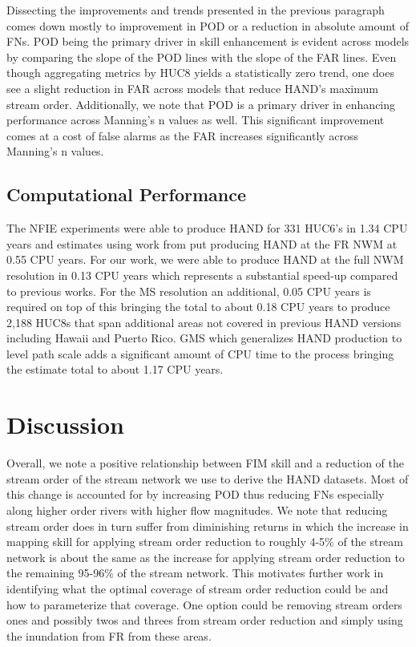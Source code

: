 \documentclass[draft]{dependencies/agujournal2019}
\begin{document}
Dissecting the improvements and trends presented in the previous paragraph comes down mostly to improvement in POD or a reduction in absolute amount of FNs.
POD being the primary driver in skill enhancement is evident across models by comparing the slope of the POD lines with the slope of the FAR lines.
Even though aggregating metrics by HUC8 yields a statistically zero trend, one does see a slight reduction in FAR across models that reduce HAND's maximum stream order.
Additionally, we note that POD is a primary driver in enhancing performance across Manning's n values as well.
This significant improvement comes at a cost of false alarms as the FAR increases significantly across Manning's n values.
%
\subsection{Computational Performance}
\label{ssec:compuational_performance}
%
The NFIE experiments were able to produce HAND for 331 HUC6's in 1.34 CPU years \cite{liu2016cybergis} and estimates using work from  put producing HAND at the FR NWM at 0.55 CPU years. 
For our work, we were able to produce HAND at the full NWM resolution in 0.13 CPU years which represents a substantial speed-up compared to previous works.
For the MS resolution an additional, 0.05 CPU years is required on top of this bringing the total to about 0.18 CPU years to produce 2,188 HUC8s that span additional areas not covered in previous HAND versions including Hawaii and Puerto Rico.
GMS which generalizes HAND production to level path scale adds a significant amount of CPU time to the process bringing the estimate total to about 1.17 CPU years.
%
\clearpage %
\section{Discussion}
\label{sec:discussion}
%
Overall, we note a positive relationship between FIM skill and a reduction of the stream order of the stream network we use to derive the HAND datasets.
Most of this change is accounted for by increasing POD thus reducing FNs especially along higher order rivers with higher flow magnitudes.
We note that reducing stream order does in turn suffer from diminishing returns in which the increase in mapping skill for applying stream order reduction to roughly 4-5\% of the stream network is about the same as the increase for applying stream order reduction to the remaining 95-96\% of the stream network.
This motivates further work in identifying what the optimal coverage of stream order reduction could be and how to parameterize that coverage. 
One option could be removing stream orders ones and possibly twos and threes from stream order reduction and simply using the inundation from FR from these areas.
\end{document}
